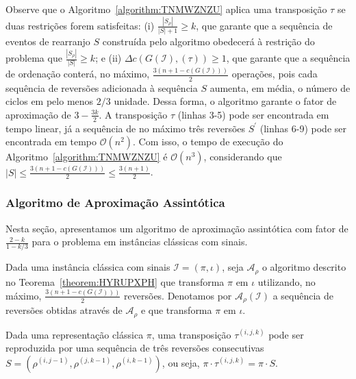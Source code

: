 Observe que o Algoritmo~\ref{algorithm:TNMWZNZU} aplica uma transposição $\tau$ se duas restrições forem satisfeitas: (i) $\frac{|S_{\rho}|}{|S| + 1} \ge k$, que garante que a sequência de eventos de rearranjo $S$ construída pelo algoritmo obedecerá à restrição do problema que $\frac{|S_{\rho}|}{|S|} \ge k$; e (ii) $\Delta c(G(\mathcal{I}), (\tau)) \ge 1$, que garante que a sequência de ordenação conterá, no máximo, $\frac{3(n + 1 -c(G(\mathcal{I})))}{2}$ operações, pois cada sequência de reversões adicionada à sequência $S$ aumenta, em média, o número de ciclos em pelo menos $2/3$ unidade. Dessa forma, o algoritmo garante o fator de aproximação de $3-\frac{3k}{2}$. A transposição $\tau$ (linhas 3-5) pode ser encontrada em tempo linear, já a sequência de no máximo três reversões $S^{\prime}$ (linhas 6-9) pode ser encontrada em tempo $\mathcal{O}(n^2)$. Com isso, o tempo de execução do Algoritmo~\ref{algorithm:TNMWZNZU} é $\mathcal{O}(n^3)$, considerando que $|S| \le \frac{3(n + 1 -c(G(\mathcal{I})))}{2} \le \frac{3({n+1})}{2}$.

\subsubsection{Algoritmo de Aproximação Assintótica}

Nesta seção, apresentamos um algoritmo de aproximação assintótica com fator de $\frac{2-k}{1-k/3}$ para o problema \SbPRT{} em instâncias clássicas com sinais.

\begin{definition}
Dada uma instância clássica com sinais $\mathcal{I} = (\pi,\iota)$, seja $\mathcal{A}_\rho$ o algoritmo descrito no Teorema~\ref{theorem:HYRUPXPH} que transforma $\pi$ em $\iota$ utilizando, no máximo, $\frac{3(n + 1 -c(G(\mathcal{I})))}{2}$ reversões. Denotamos por $\mathcal{A}_\rho(\mathcal{I})$ a sequência de reversões obtidas através de $\mathcal{A}_\rho$ e que transforma $\pi$ em $\iota$.
\end{definition}

\begin{remark}\label{remark:DNLEDNKT}
Dada uma representação clássica $\pi$, uma transposição $\tau^{(i,j,k)}$ pode ser reproduzida por uma sequência de três reversões consecutivas $S=(\rho^{(i,{j-1})},\rho^{(j,{k-1})},\rho^{(i,{k-1})})$, ou seja, $\pi \cdot \tau^{(i,j,k)} = \pi \cdot S$. 
\end{remark}

